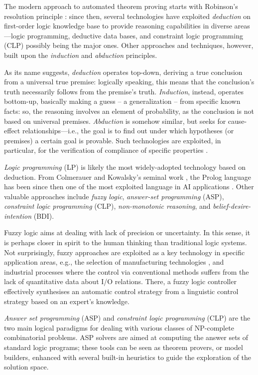 \documentclass[12pt,a4paper,openright,twoside]{book}
\begin{document}
The modern approach to automated theorem proving starts with Robinson's resolution principle \cite{robinson1965}: since then, several technologies have exploited \emph{deduction} on first-order logic knowledge base to provide reasoning capabilities in diverse areas---logic programming, deductive data bases, and constraint logic programming (CLP) possibly being the major ones.
%
Other approaches and techniques, however, built upon the \emph{induction} and \emph{abduction} principles.

As its name suggests, \emph{deduction} operates top-down, deriving a true conclusion from a universal true premise: logically speaking, this means that the conclusion's truth necessarily follows from the premise's truth.
%
\emph{Induction}, instead, operates bottom-up, basically making a guess -- a generalization -- from specific known facts: so, the reasoning involves an element of probability, as the conclusion is not based on universal premises.
%
\emph{Abduction} is somehow similar, but seeks for cause-effect relationships---i.e., the goal is to find out under which hypotheses (or premises) a certain goal is provable. 
%
Such technologies are exploited, in particular, for the verification of compliance of specific properties \cite{montali2010}. 

\emph{Logic programming} (LP) is likely the most widely-adopted technology based on deduction. 
%
From Colmerauer and Kowalsky's seminal work \cite{Kowalski1974,colmerauer1986-theoreticalProlog}, the Prolog language has been since then one of the most exploited language in AI applications \cite{Dawson1996}. 
%
Other valuable approaches include \emph{fuzzy logic}, \emph{answer-set programming} (ASP), \emph{constraint logic programming} (CLP), \emph{non-monotonic reasoning}, and \emph{belief-desire-intention} (BDI).

Fuzzy logic \cite{yen1999} aims at dealing with lack of precision or uncertainty.
%
In this sense, it is perhaps closer in spirit to the human thinking than traditional logic systems. 
%
Not surprisingly, fuzzy approaches are exploited as a key technology in specific application areas, e.g., the selection of manufacturing technologies \cite{goyal2012}, and industrial processes where the control via conventional methods suffers from the lack of quantitative data about I/O relations.
%
There, a fuzzy logic controller effectively synthesises an automatic control strategy from a linguistic control strategy based on an expert's knowledge. 

\emph{Answer set programming} (ASP) and \emph{constraint logic programming} (CLP) are the two main logical paradigms for dealing with various classes of NP-complete combinatorial problems. 
%
ASP solvers are aimed at computing the answer sets of standard logic programs; these tools can be seen as theorem provers, or model builders, enhanced with several built-in heuristics to guide the exploration of the solution space.
%
\end{document}
